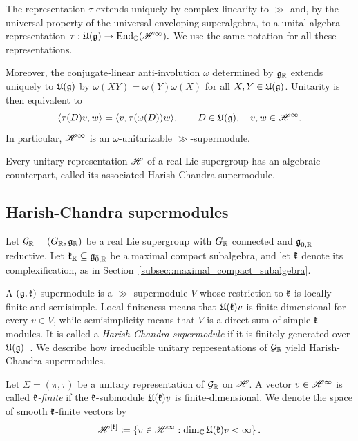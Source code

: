 The representation $\tau$ extends uniquely by complex linearity to $\gg$ and, by the universal property of the universal enveloping superalgebra, to a unital algebra representation
$
\tau:{\mathfrak U}({\mathfrak{g}})\to\operatorname{End}_{{\mathbb C}}({\mathscr{H}}^\infty).
$
We use the same notation for all these representations. 

Moreover, the conjugate-linear anti-involution $\omega$ determined by ${\mathfrak{g}}_{{\mathbb R}}$ extends uniquely to ${\mathfrak U}({\mathfrak{g}})$ by
$
\omega(XY)=\omega(Y)\omega(X)
$ for all $X,Y\in {\mathfrak U}({\mathfrak{g}})$. Unitarity is then equivalent to
\begin{equation}
\langle\tau(D)v,w\rangle
=
\langle v,\tau(\omega(D))w\rangle,
\qquad
D\in{\mathfrak U}({\mathfrak{g}}),\quad v,w\in{\mathscr{H}}^\infty.
\end{equation}
In particular, ${\mathscr{H}}^\infty$ is an $\omega$-unitarizable $\gg$-supermodule.

Every unitary representation ${\mathscr{H}}$ of a real Lie supergroup has an algebraic counterpart, called its associated Harish-Chandra supermodule.

\subsection{Harish-Chandra supermodules}\label{subsec::HC_supermodules}
Let ${\mathcal{G}}_{{\mathbb R}}=(G_{{\mathbb R}},{\mathfrak{g}}_{{\mathbb R}})$ be a real Lie supergroup with $G_{{\mathbb R}}$ connected and ${\mathfrak{g}}_{\bar0,{\mathbb R}}$ reductive. Let ${\mathfrak k}_{{\mathbb R}}\subseteq{\mathfrak{g}}_{\bar0,{\mathbb R}}$ be a maximal compact subalgebra, and let ${\mathfrak k}$ denote its complexification, as in Section~\ref{subsec::maximal_compact_subalgebra}.

A $({\mathfrak{g}},{\mathfrak k})$-supermodule is a $\gg$-supermodule $V$ whose restriction to ${\mathfrak k}$ is locally finite and semisimple. Local finiteness means that ${\mathfrak U}({\mathfrak k})v$ is finite-dimensional for every $v\in V$, while semisimplicity means that $V$ is a direct sum of simple ${\mathfrak k}$-modules. It is called a \emph{Harish-Chandra supermodule} if it is finitely generated over ${\mathfrak U}({\mathfrak{g}})$~\cite{Carmeli_Fioresi_Varadarajan_HW,Alldridge}. We describe how irreducible unitary representations of ${\mathcal{G}}_{{\mathbb R}}$ yield Harish-Chandra supermodules.

Let $\Sigma=(\pi,\tau)$ be a unitary representation of ${\mathcal{G}}_{{\mathbb R}}$ on ${\mathscr{H}}$. A vector $v\in{\mathscr{H}}^\infty$ is called \emph{${\mathfrak k}$-finite} if the ${\mathfrak k}$-submodule ${\mathfrak U}({\mathfrak k})v$ is finite-dimensional. We denote the space of smooth ${\mathfrak k}$-finite vectors by
\begin{equation}
{\mathscr{H}}^{[{\mathfrak k}]}
\coloneqq
\left\{
v\in{\mathscr{H}}^\infty:
\dim_{{\mathbb C}}{\mathfrak U}({\mathfrak k})v<\infty
\right\}.
\end{equation}

